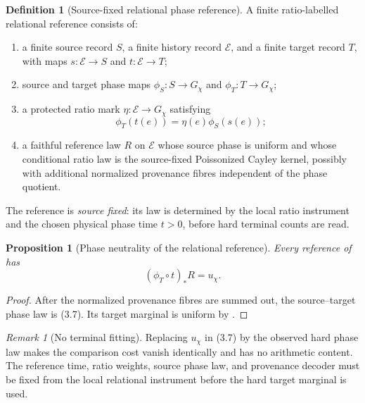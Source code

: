 \documentclass[11pt]{article}
\newtheorem{proposition}[theorem]{Proposition}
\theoremstyle{definition}
\newtheorem{definition}[theorem]{Definition}
\theoremstyle{remark}
\newtheorem{remark}[theorem]{Remark}
\begin{document}
\begin{definition}[Source-fixed relational phase reference]
\label{def:source-fixed-reference}
A finite ratio-labelled relational reference consists of:
\begin{enumerate}[label=\textup{(Q\arabic*)},leftmargin=3em]
\item a finite source record $S$, a finite history record $\mathcal E$, and a
      finite target record $T$, with maps
      $s:\mathcal E\to S$ and $t:\mathcal E\to T$;
\item source and target phase maps
      $\phi_S:S\to G_\chi$ and $\phi_T:T\to G_\chi$;
\item a protected ratio mark $\eta:\mathcal E\to G_\chi$ satisfying
      \[
       \phi_T(t(e))=\eta(e)\phi_S(s(e));
      \]
\item a faithful reference law $R$ on $\mathcal E$ whose source phase is
      uniform and whose conditional ratio law is the source-fixed
      Poissonized Cayley kernel, possibly with additional normalized
      provenance fibres independent of the phase quotient.
\end{enumerate}
The reference is \emph{source fixed}: its law is determined by the local ratio
instrument and the chosen physical phase time $t>0$, before hard terminal
counts are read.
\end{definition}

\begin{proposition}[Phase neutrality of the relational reference]
\label{prop:reference-phase-neutral}
Every reference of  has
\[
 \boxed{(\phi_T\circ t)_*R=u_\chi.}
 \tag{3.8}
\]
\end{proposition}

\begin{proof}
After the normalized provenance fibres are summed out, the source--target phase
law is \textup{(3.7)}.  Its target marginal is uniform by
.
\end{proof}

\begin{remark}[No terminal fitting]
Replacing $u_\chi$ in \textup{(3.7)} by the observed hard phase law makes the
comparison cost vanish identically and has no arithmetic content.  The
reference time, ratio weights, source phase law, and provenance decoder must be
fixed from the local relational instrument before the hard target marginal is
used.
\end{remark}

\end{document}
